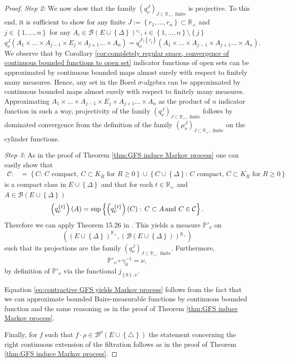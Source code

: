 \documentclass[a4paper,12pt]{article}
\theoremstyle{definition}
\theoremstyle{remark}
\numberwithin{equation}{section}
\numberwithin{theorem}{section}
\begin{document}
\begin{proof}
\emph{Step 2:} We now show that the family $
\left(q_{\nu}^{J}\right)_{J\subset\mathbb{R}_{+},\text{ finite}}
$
 is projective. To this end, it is sufficient to show for any finite
$J:=\left\{ r_{1},...,r_{n}\right\} \subset\mathbb{R}_{+}$ and $j\in\left\{ 1,...,n\right\} $
for any $A_{i}\in\mathcal{B}(E\cup\left\{ \Delta\right\} ){}^{r_{i}}$,
$i\in\left\{ 1,...,n\right\} \setminus\left\{ j\right\} $
\[
q_{\nu}^{J}(A_{1}\times...\times A_{j-1}\times E_{j}\times A_{j+1}...\times A_{n})=q_{\nu}^{J\setminus\left\{ r_{j}\right\} }(A_{1}\times...\times A_{j-1}\times A_{j+1}...\times A_{n}).
\]
We observe that by Corollary \ref{cor:completely regular space, convergence of continuous bounded functions to open set} indicator functions of open sets can be approximated by continuous bounded maps almost surely with respect to finitely many measures. Hence, any set in the Borel $\sigma$-algebra
can be approximated by continuous bounded maps almost surely with respect to finitely many measures. 
Approximating $A_{1}\times...\times A_{j-1}\times E_{j}\times A_{j+1}...\times A_{n}$  as the product of $n$ indicator function in such a way, projectivity of the
family
$
\left(q_{\nu}^{J}\right)_{J\subset\mathbb{R}_{+},\text{ finite}}
$
follows by dominated convergence from the definition of the family $
\left(\mu_{\nu}^{J}\right)_{J\subset\mathbb{R}_{+},\text{ finite}}
$
on the cylinder functions. 

\emph{Step 3:} As in the proof of Theorem \ref{thm:GFS induce Markov process}
one can easily show that 
\begin{align*}
\mathcal{C}: & =\left\{ C:\,C\text{ compact},\,C\subset K_{R}\text{ for }R\geq0\right\} 
 \cup\left\{ C\cup\left\{ \Delta\right\} :\,C\text{ compact},\,C\subset K_{R}\text{ for }R\geq0\right\} 
\end{align*}
is a compact class in $E\cup\left\{ \Delta\right\} $ and that for
each $t\in\mathbb{R}_{+}$ and $A\in\mathcal{B}(E\cup\left\{ \Delta\right\} )$
\[
\left(q_{\nu}^{\left\{ t\right\} }\right)(A)=\sup\left\{ \left(q_{\nu}^{\left\{ t\right\} }\right)(C):\,C\subset A\text{\,and }C\in\mathcal{C}\right\}.
\]
Therefore we can apply Theorem 15.26 in \cite{AlB}.
This yields a measure $\mathbb{P}'_{\nu}$ on
\[
\left(\left(E\cup\left\{ \Delta\right\} \right)^{\mathbb{\mathbb{R}}_{+}},\left(\mathcal{B}(E\cup\left\{ \Delta\right\} )\right){}^{\mathbb{\mathbb{R}}_{+}}\right)
\]
such that its projections are the family $\left(q_{\nu}^{J}\right)_{J\subset\mathbb{R}_{+},\text{ finite}}$.
Furthermore, 
\[
\mathbb{P}'_{\nu}\circ\gamma_{\text{0}}^{-1}=\nu,
\]
by definition of $\mathbb{P}'_{\nu}$ via the functional $j_{\left\{ 0\right\} ,\nu}$.

Equation \eqref{eq:contractive GFS yields Markov process} follows from
the fact that we can approximate bounded Baire-measurable functions  by continuous bounded function 
and the same reasoning as in the proof of Theorem \ref{thm:GFS induce Markov process}. 

Finally, for $f$ such that $f\cdot\rho\in\mathcal{\mathscr{B}}^{\rho}(E\cup\left\{ \triangle\right\} )$
the statement concerning the 
right continuous extension of the filtration follows as in the proof of Theorem
\ref{thm:GFS induce Markov process}. 
\end{proof}
\end{document}
